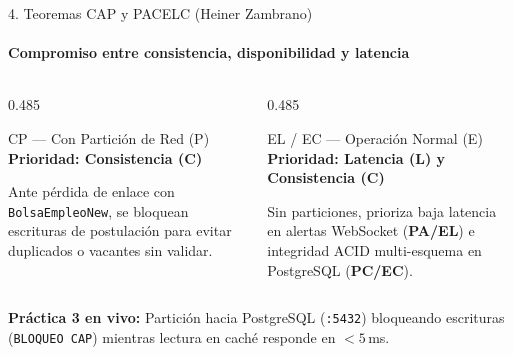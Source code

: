 \documentclass[aspectratio=169,10pt]{beamer}
\begin{document}
\begin{frame}{4. Teoremas CAP y PACELC (Heiner Zambrano)}
  \framesubtitle{Compromiso entre consistencia, disponibilidad y latencia \cite{ref5}}
  \vspace{0.15cm}
  \begin{columns}[T,totalwidth=\textwidth]
    \begin{column}{0.485\textwidth}
      \begin{bluecard}{CP --- Con Partición de Red (P)}
        \textbf{Prioridad: Consistencia (C)}\par
        \vspace{0.15cm}
        \footnotesize Ante pérdida de enlace con \texttt{BolsaEmpleoNew}, se bloquean escrituras de postulación para evitar duplicados o vacantes sin validar.
      \end{bluecard}
    \end{column}
    \begin{column}{0.485\textwidth}
      \begin{ambercard}{EL / EC --- Operación Normal (E)}
        \textbf{Prioridad: Latencia (L) y Consistencia (C)}\par
        \vspace{0.15cm}
        \footnotesize Sin particiones, prioriza baja latencia en alertas WebSocket (\textbf{PA/EL}) e integridad ACID multi-esquema en PostgreSQL (\textbf{PC/EC}).
      \end{ambercard}
    \end{column}
  \end{columns}
  \vspace{0.4cm}
  \begin{demobar}
    \textcolor{AmberAccent}{\textbf{Práctica 3 en vivo:}} Partición hacia PostgreSQL (\texttt{:5432}) bloqueando escrituras (\texttt{BLOQUEO CAP}) mientras lectura en caché responde en $< 5$\,ms.
  \end{demobar}
\end{frame}
\end{document}
